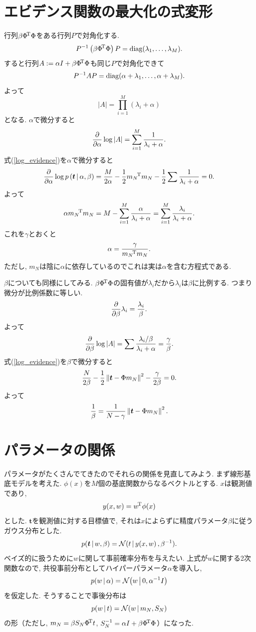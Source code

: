 \section{エビデンス関数の最大化の式変形}
行列$\beta{\Phi}^{\!\mathrm{T}}\Phi$をある行列$P$で対角化する.
$$
P^{-1} \left(\beta{\Phi}^{\!\mathrm{T}}\Phi\right) P = \mathop{\mathrm{diag}}\nolimits(\lambda_1, \ldots, \lambda_M).
$$
すると行列$A:=\alpha I + \beta{\Phi}^{\!\mathrm{T}}\Phi$も同じ$P$で対角化できて
$$
P^{-1} A P = \mathop{\mathrm{diag}}\nolimits(\alpha + \lambda_1, \ldots, \alpha + \lambda_M).
$$
よって
$$
|A|=\prod_{i=1}^M\left(\lambda_i + \alpha\right)
$$
となる. $\alpha$で微分すると
$$
\frac{\partial}{\partial \alpha}\log |A|=\sum_{i=1}^M \frac{1}{\lambda_i + \alpha}.
$$
式(\ref{log_evidence})を$\alpha$で微分すると
$$
\frac{\partial}{\partial \alpha} \log p\left(\bm{t}\,|\,\alpha,\beta\right)=\frac{M}{2\alpha}-\frac{1}{2}{m_N}^{\!\mathrm{T}}m_N - \frac{1}{2}\sum \frac{1}{\lambda_i + \alpha}=0.
$$
よって
$$
\alpha {m_N}^{\!\mathrm{T}}m_N = M-\sum_{i=1}^M \frac{\alpha}{\lambda_i + \alpha}=\sum_{i=1}^M \frac{\lambda_i}{\lambda_i + \alpha}.
$$
これを$\gamma$とおくと
$$
\alpha=\frac{\gamma}{{m_N}^{\!\mathrm{T}}m_N}.
$$
ただし, $m_N$は陰に$\alpha$に依存しているのでこれは実は$\alpha$を含む方程式である.

$\beta$についても同様にしてみる. $\beta{\Phi}^{\!\mathrm{T}}\Phi$の固有値が$\lambda_i$だから$\lambda_i$は$\beta$に比例する.
つまり微分が比例係数に等しい.
$$
\frac{\partial}{\partial \beta} \lambda_i = \frac{\lambda_i}{\beta}.
$$
よって
$$
\frac{\partial}{\partial \beta} \log |A| = \sum \frac{\lambda_i/\beta}{\lambda_i + \alpha}=\frac{\gamma}{\beta}.
$$
式(\ref{log_evidence})を$\beta$で微分すると
$$
\frac{N}{2\beta} - \half\Norm{\bm{t}-\Phi m_N}^2-\frac{\gamma}{2\beta}=0.
$$
よって
$$
\frac{1}{\beta}=\frac{1}{N-\gamma}\Norm{\bm{t}-\Phi m_N}^2.
$$
\vspace{0pt}

\section{パラメータの関係}
パラメータがたくさんでてきたのでそれらの関係を見直してみよう.
まず線形基底モデルを考えた. $\phi(x)$を$M$個の基底関数からなるベクトルとする.
$x$は観測値であり,
$$
y(x,w)={w}^{\!\mathrm{T}}\phi(x)
$$
とした. $\bm{t}$を観測値に対する目標値で, それは$x$によらずに精度パラメータ$\beta$に従うガウス分布とした.
$$
\fnvPair p(\bm{t}|w,\beta)=\fnvPair\calN(t|y(x,w),\beta^{-1}).
$$
ベイズ的に扱うために$w$に関して事前確率分布を与えたい. 上式が$w$に関する2次関数なので,
共役事前分布としてハイパーパラメータ$\alpha$を導入し,
$$
\fnvPair p(w|\alpha)=\fnvPair\calN(w|0, \alpha^{-1}I)
$$
を仮定した. そうすることで事後分布は
$$
\fnvPair p(w|t)=\fnvPair\calN(w|m_N,S_N)
$$
の形（ただし, $m_N=\beta S_N{\Phi}^{\!\mathrm{T}}t$, $S_N^{-1}=\alpha I + \beta {\Phi}^{\!\mathrm{T}}\Phi$）になった.

